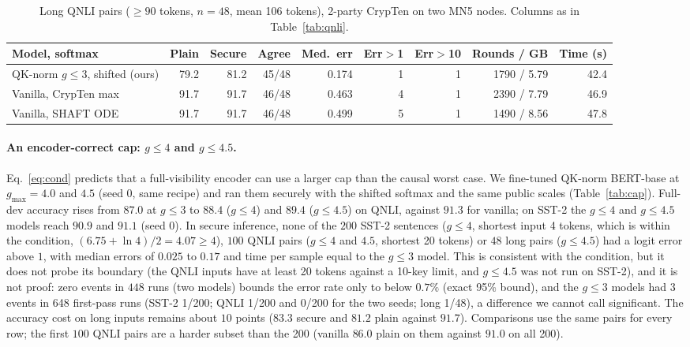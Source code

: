 \documentclass[11pt]{article}
\begin{document}
\begin{table}[tbp]\centering\small\setlength{\tabcolsep}{3pt}
\caption{Long QNLI pairs ($\ge90$ tokens, $n=48$, mean 106 tokens), 2-party CrypTen on two MN5 nodes. Columns as in Table~\ref{tab:qnli}.}\label{tab:long}
\begin{tabular}{@{}lrrrrrrrr@{}}\toprule
Model, softmax & Plain & Secure & Agree & Med.\ err & Err$>$1 & Err$>$10 & Rounds / GB & Time (s)\\\midrule
QK-norm $g\le3$, shifted (ours) & 79.2 & 81.2 & 45/48 & 0.174 & 1 & 1 & 1790 / 5.79 & 42.4\\
Vanilla, CrypTen max & 91.7 & 91.7 & 46/48 & 0.463 & 4 & 1 & 2390 / 7.79 & 46.9\\
Vanilla, SHAFT ODE & 91.7 & 91.7 & 46/48 & 0.499 & 5 & 1 & 1490 / 8.56 & 47.8\\\bottomrule
\end{tabular}
\end{table}

\paragraph{An encoder-correct cap: $g\le4$ and $g\le4.5$.} Eq.~\eqref{eq:cond} predicts that a full-visibility encoder can use a larger cap than the causal worst case. We fine-tuned QK-norm BERT-base at $g_{\max}=4.0$ and $4.5$ (seed 0, same recipe) and ran them securely with the shifted softmax and the same public scales (Table~\ref{tab:cap}). Full-dev accuracy rises from $87.0$ at $g\le3$ to $88.4$ ($g\le4$) and $89.4$ ($g\le4.5$) on QNLI, against $91.3$ for vanilla; on SST-2 the $g\le4$ and $g\le4.5$ models reach $90.9$ and $91.1$ (seed 0). In secure inference, none of the $200$ SST-2 sentences ($g\le4$, shortest input 4 tokens, which is within the condition, $(6.75+\ln4)/2=4.07\ge4$), $100$ QNLI pairs ($g\le4$ and $4.5$, shortest 20 tokens) or $48$ long pairs ($g\le4.5$) had a logit error above $1$, with median errors of $0.025$ to $0.17$ and time per sample equal to the $g\le3$ model. This is consistent with the condition, but it does not probe its boundary (the QNLI inputs have at least 20 tokens against a 10-key limit, and $g\le4.5$ was not run on SST-2), and it is not proof: zero events in $448$ runs (two models) bounds the error rate only to below $0.7\%$ (exact 95\% bound), and the $g\le3$ models had 3 events in 648 first-pass runs (SST-2 1/200; QNLI 1/200 and 0/200 for the two seeds; long 1/48), a difference we cannot call significant. The accuracy cost on long inputs remains about $10$ points ($83.3$ secure and $81.2$ plain against $91.7$). Comparisons use the same pairs for every row; the first $100$ QNLI pairs are a harder subset than the 200 (vanilla $86.0$ plain on them against $91.0$ on all 200).
\end{document}
